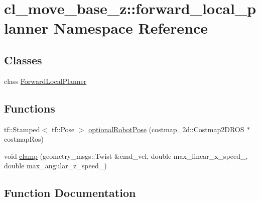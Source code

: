 \hypertarget{namespacecl__move__base__z_1_1forward__local__planner}{}\section{cl\+\_\+move\+\_\+base\+\_\+z\+:\+:forward\+\_\+local\+\_\+planner Namespace Reference}
\label{namespacecl__move__base__z_1_1forward__local__planner}
\subsection*{Classes}
\begin{DoxyCompactItemize}
\item 
class \hyperlink{classcl__move__base__z_1_1forward__local__planner_1_1ForwardLocalPlanner}{Forward\+Local\+Planner}
\end{DoxyCompactItemize}
\subsection*{Functions}
\begin{DoxyCompactItemize}
\item 
tf\+::\+Stamped$<$ tf\+::\+Pose $>$ \hyperlink{namespacecl__move__base__z_1_1forward__local__planner_a4c20f9fe0ca67779c53e90182baf4997}{optional\+Robot\+Pose} (costmap\+\_\+2d\+::\+Costmap2\+D\+R\+OS $\ast$costmap\+Ros)
\item 
void \hyperlink{namespacecl__move__base__z_1_1forward__local__planner_a6cd0f1c55d79df6809ad5d726e190607}{clamp} (geometry\+\_\+msgs\+::\+Twist \&cmd\+\_\+vel, double max\+\_\+linear\+\_\+x\+\_\+speed\+\_\+, double max\+\_\+angular\+\_\+z\+\_\+speed\+\_\+)
\end{DoxyCompactItemize}


\subsection{Function Documentation}
